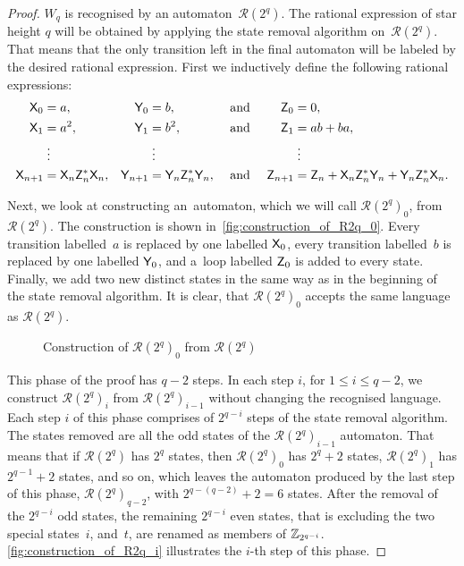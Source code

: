 \begin{proof}
    $W_q$ is recognised by an automaton~${\mathcal{R}(2^q)}$. The rational expression of star height $q$ will be obtained by applying the state removal algorithm on~${\mathcal{R}(2^q)}$. That means that the only transition left in the final automaton will be labeled by the desired rational expression. First we inductively define the following rational expressions:
    \begin{align*}
        {\mathsf{X}}_0 &= a, & {\mathsf{Y}}_0 &= b, & &\text{ and } & {\mathsf{Z}}_0 &= 0, \\
        {\mathsf{X}}_1 &= a^2, & {\mathsf{Y}}_1 &= b^2, & &\text{ and } & {\mathsf{Z}}_1 &= ab+ba, \\
        &\; \vdots & &\; \vdots & & & &\; \vdots \\
        {\mathsf{X}}_{n+1} &= {\mathsf{X}}_n {\mathsf{Z}}_n^* {\mathsf{X}}_n, & {\mathsf{Y}}_{n+1} &= {\mathsf{Y}}_n {\mathsf{Z}}_n^* {\mathsf{Y}}_n, & &\text{ and } & {\mathsf{Z}}_{n+1} &= {\mathsf{Z}}_n + {\mathsf{X}}_n {\mathsf{Z}}_n^* {\mathsf{Y}}_n + {\mathsf{Y}}_n {\mathsf{Z}}_n^* {\mathsf{X}}_n.
    \end{align*}

    Next, we look at constructing an~automaton, which we will call ${\mathcal{R}(2^q)}_0$, from ${\mathcal{R}(2^q)}$. The construction is shown in~\autoref*{fig:construction_of_R2q_0}. Every transition labelled~$a$ is replaced by one labelled ${\mathsf{X}}_0$, every transition labelled~$b$ is replaced by one labelled ${\mathsf{Y}}_0$, and a~loop labelled ${\mathsf{Z}}_0$ is added to every state. Finally, we add two new distinct states in the same way as in the beginning of the state removal algorithm. It is clear, that ${\mathcal{R}(2^q)}_0$ accepts the same language as ${\mathcal{R}(2^q)}$.

    \begin{figure}[h]%
        \centering
        \hspace{60pt}%
        \caption{Construction of ${\mathcal{R}(2^q)}_0$ from ${\mathcal{R}(2^q)}$}\label{fig:construction_of_R2q_0}%
    \end{figure}

    This phase of the proof has $q-2$ steps. In each step $i$, for $1 \leq i \leq q-2$, we construct ${\mathcal{R}(2^q)}_i$ from ${\mathcal{R}(2^q)}_{i-1}$ without changing the recognised language. Each step $i$ of this phase comprises of $2^{q-i}$ steps of the state removal algorithm. The states removed are all the odd states of the ${\mathcal{R}(2^q)}_{i-1}$ automaton. That means that if ${\mathcal{R}(2^q)}$ has $2^q$ states, then ${\mathcal{R}(2^q)}_0$ has $2^q + 2$ states, ${\mathcal{R}(2^q)}_1$ has $2^{q-1} + 2$ states, and so on, which leaves the automaton produced by the last step of this phase, ${\mathcal{R}(2^q)}_{q-2}$, with $2^{q-(q-2)} + 2 = 6$ states. After the removal of the $2^{q-i}$ odd states, the remaining $2^{q-i}$ even states, that is excluding the two special states~$i$, and~$t$, are renamed as members of $\mathbb{Z}_{2^{q-i}}$. \autoref*{fig:construction_of_R2q_i} illustrates the $i$-th step of this phase.


\end{proof}

